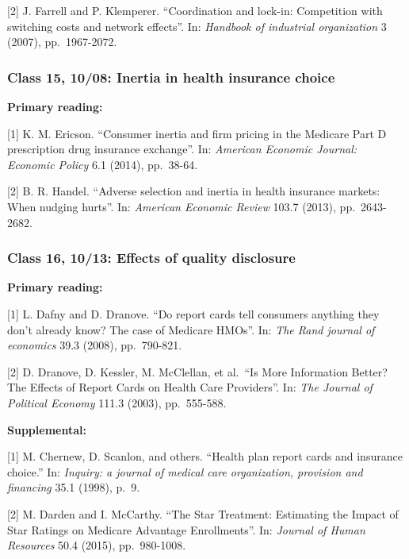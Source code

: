 \documentclass[11pt,]{article}
\begin{document}
{[}2{]} J. Farrell and P. Klemperer. ``Coordination and lock-in:
Competition with switching costs and network effects''. In:
\emph{Handbook of industrial organization} 3 (2007), pp.~1967-2072.

\hypertarget{class-15-1008-inertia-in-health-insurance-choice}{%
\subsubsection{Class 15, 10/08: Inertia in health insurance
choice}\label{class-15-1008-inertia-in-health-insurance-choice}}

\textbf{Primary reading:}

{[}1{]} K. M. Ericson. ``Consumer inertia and firm pricing in the
Medicare Part D prescription drug insurance exchange''. In:
\emph{American Economic Journal: Economic Policy} 6.1 (2014), pp.~38-64.

{[}2{]} B. R. Handel. ``Adverse selection and inertia in health
insurance markets: When nudging hurts''. In: \emph{American Economic
Review} 103.7 (2013), pp.~2643-2682.

\hypertarget{class-16-1013-effects-of-quality-disclosure}{%
\subsubsection{Class 16, 10/13: Effects of quality
disclosure}\label{class-16-1013-effects-of-quality-disclosure}}

\textbf{Primary reading:}

{[}1{]} L. Dafny and D. Dranove. ``Do report cards tell consumers
anything they don't already know? The case of Medicare HMOs''. In:
\emph{The Rand journal of economics} 39.3 (2008), pp.~790-821.

{[}2{]} D. Dranove, D. Kessler, M. McClellan, et al.~``Is More
Information Better? The Effects of Report Cards on Health Care
Providers''. In: \emph{The Journal of Political Economy} 111.3 (2003),
pp.~555-588.

\textbf{Supplemental:}

{[}1{]} M. Chernew, D. Scanlon, and others. ``Health plan report cards
and insurance choice.'' In: \emph{Inquiry: a journal of medical care
organization, provision and financing} 35.1 (1998), p.~9.

{[}2{]} M. Darden and I. McCarthy. ``The Star Treatment: Estimating the
Impact of Star Ratings on Medicare Advantage Enrollments''. In:
\emph{Journal of Human Resources} 50.4 (2015), pp.~980-1008.
\end{document}
